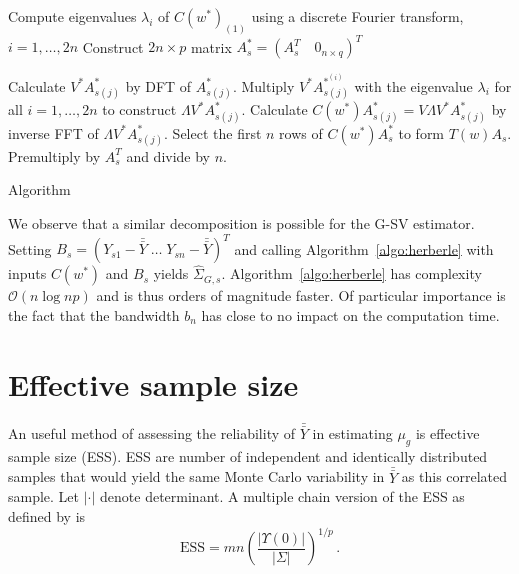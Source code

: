 \documentclass[12pt]{article}
\theoremstyle{remark}
\begin{document}
\begin{algorithm}[htbp] 
\DontPrintSemicolon
\SetAlgoLined
Compute eigenvalues $\lambda_i$ of  $C(w^*)_{(1)}$ using a discrete Fourier transform, $i = 1, \dots, 2n$\;
Construct $2n \times p$ matrix $A^*_s = (A_s^T  \quad 0_{n \times q})^T$\;

    { 
    Calculate $V^*A^*_{s(j)}$ by DFT of $A^*_{s(j)}$.\;
    Multiply $V^* A_{s(j)}^{*^{(i)}}$ with the eigenvalue $\lambda_i$ for all $i = 1, \dots, 2n$ to construct $\Lambda V^* A_{s(j)}^*$.\;
    Calculate $C(w^*)A^*_{s(j)} = V \Lambda V^* A_{s(j)}^*$ by inverse FFT of $\Lambda V^* A_{s(j)}^*$.\;
    }
 Select the first $n$ rows of $C(w^*)A^*_s$ to form $T(w)A_s$.\;
 Premultiply by $A_s^T$ and divide by $n$.\;
 \caption{\cite{heberle2017fast} Algorithm}
 \label{algo:herberle}
\end{algorithm}


We observe that a similar decomposition is possible for the G-SV estimator. Setting $B_s = (Y_{s1} - \bar{\bar{Y}} \; \dots \; Y_{sn} - \bar{\bar{Y}})^T$ and calling Algorithm~\ref{algo:herberle} with inputs $C(w^*)$ and $B_s$ yields $\hat{\Sigma}_{G,s}$. Algorithm~\ref{algo:herberle} has complexity $\mathcal{O}(n \log n p)$ and is thus orders of magnitude faster. Of particular importance is the fact that the bandwidth $b_n$ has close to no impact on the computation time.

\section{Effective sample size} \label{sec:ess}

An useful method of assessing the reliability of $\bar{\bar{Y}}$ in estimating $\mu_g$ is effective sample size (ESS). ESS are number of independent and identically distributed samples that would yield the same Monte Carlo variability in $\bar{\bar{Y}}$ as this correlated sample. Let $|\cdot|$ denote determinant. A multiple chain version of the ESS as defined by \cite{vats:fleg:jon:2019} is
\[
\textrm{ESS} = mn \left(\dfrac{|\Upsilon(0)|}{|\Sigma|}\right)^{1/p}\, .
\]
\end{document}
